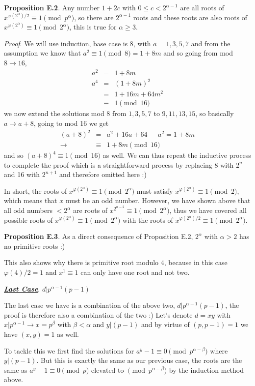 \documentclass[aps,preprint,preprintnumbers,nofootinbib,showpacs,prd]{revtex4-1}
\newcommand{\nbea}{\begin{eqnarray*}}
\newcommand{\neea}{\end{eqnarray*}}
\begin{document}
{\bf Proposition E.2}. Any number $1 + 2c$ with $0 \le c < 2^{\alpha-1}$ are all roots of $x^{\varphi(2^\alpha)/2} \equiv 1 \pmod{p^\alpha}$, so there are $2^{\alpha-1}$ roots and these roots are also roots of $x^{\varphi(2^\alpha)} \equiv 1 \pmod{2^\alpha}$, this is true for $\alpha \ge 3$.

{\it Proof}. We will use induction, base case is 8, with $a = 1, 3, 5, 7$ and from the assumption we know that $a^2 \equiv 1 \pmod{8} = 1 + 8m$ and so going from mod $8\to16$,
%
\nbea
a^2 & = & 1+8m \\
a^4 & = & (1 + 8m)^2 \\
& = & 1 + 16m + 64m^2 \\
& \equiv & 1 \pmod{16}
\neea
%
we now extend the solutions mod 8 from $1, 3, 5, 7$ to $9, 11, 13, 15$, so basically $a \to a + 8$, going to mod 16 we get
%
\nbea
(a + 8)^2 & = & a^2 + 16a + 64 ~~~~~~~ a^2 = 1+ 8m \\
\to & \equiv & 1 + 8m \pmod{16}
\neea
%
and so $(a + 8)^4 \equiv 1 \pmod{16}$ as well. We can thus repeat the inductive process to complete the proof which is a straightforward process by replacing 8 with $2^n$ and 16 with $2^{n+1}$ and therefore omitted here :)

In short, the roots of $x^{\varphi(2^\alpha)} \equiv 1 \pmod{2^\alpha}$ must satisfy $x^{\varphi(2^\alpha)} \equiv 1 \pmod{2}$, which means that $x$ must be an odd number. However, we have shown above that all odd numbers $< 2^\alpha$ are roots of $x^{2^{\alpha-2}} \equiv 1 \pmod{2^\alpha}$, thus we have covered all possible roots of $x^{\varphi(2^\alpha)} \equiv 1 \pmod{2^\alpha}$ with the roots of $x^{\varphi(2^\alpha)/2} \equiv 1 \pmod{2^\alpha}$.

{\bf Proposition E.3}. As a direct consequence of Proposition E.2, $2^\alpha$ with $\alpha > 2$ has no primitive roots :)

This also shows why there is primitive root modulo 4, because in this case $\varphi(4)/2 = 1$ and $x^1 \equiv 1$ can only have one root and not two.

\bigskip
\underline{\textbf{\textit{Last Case}}}, $d|p^{\alpha-1}(p-1)$
\bigskip

The last case we have is a combination of the above two, $d|p^{\alpha-1}(p-1)$, the proof is therefore also a combination of the two :) Let's denote $d = xy$ with $x|p^{\alpha-1} \to x = p^\beta$ with $\beta < \alpha$ and $y|(p-1)$ and by virtue of $(p,p-1) = 1$ we have $(x,y) = 1$ as well.

To tackle this we first find the solutions for $a^y - 1 \equiv 0 \pmod{p^{\alpha-\beta}}$ where $y|(p-1)$. But this is exactly the same as our previous case, the roots are the same as $a^y-1 \equiv 0 \pmod{p}$ elevated to $\pmod{p^{\alpha-\beta}}$ by the induction method above.
\end{document}
